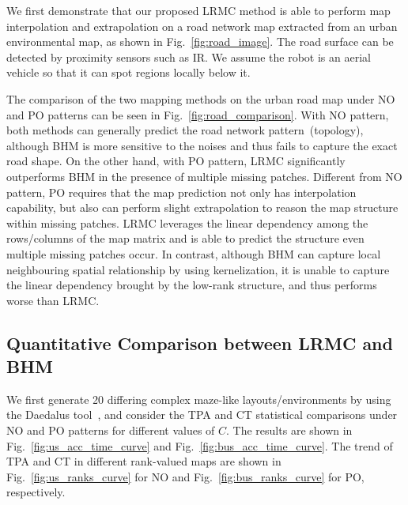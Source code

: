 We first demonstrate that our proposed LRMC method is able to perform map interpolation and extrapolation on a road network map extracted from an  urban environmental map, as shown in Fig.~\ref{fig:road_image}. 
The road surface can be detected by proximity sensors such as IR. We assume the robot is an aerial vehicle so that it can spot regions locally below it. 

The comparison of the two mapping methods on the urban road map under NO and PO patterns can be seen in Fig.~\ref{fig:road_comparison}. With NO pattern, both methods can generally predict the road network pattern~(topology), although BHM is more sensitive to the noises and thus fails to capture the exact road shape. On the other hand, with PO pattern, LRMC significantly outperforms BHM in the presence of multiple missing patches. 
Different from NO pattern, PO requires that the map prediction not only has interpolation capability, but also can perform slight extrapolation to reason the map structure within missing patches. 
LRMC leverages the linear dependency among the rows/columns of the map matrix and is able to predict the structure even multiple missing patches occur. In contrast, although BHM can capture local neighbouring spatial relationship by using kernelization, it is unable to capture the linear dependency brought by the low-rank structure, and thus performs worse than LRMC. 

\subsection{Quantitative Comparison between LRMC and BHM}

We first generate 20 differing complex maze-like layouts/environments by using the Daedalus tool~\cite{daedalus}, and consider the TPA and CT statistical comparisons under NO and PO patterns for different values of $C$. 
The results are shown in Fig.~\ref{fig:us_acc_time_curve} and Fig.~\ref{fig:bus_acc_time_curve}. 
The trend of TPA and CT in different rank-valued maps %
are shown in Fig.~\ref{fig:us_ranks_curve} for NO and Fig.~\ref{fig:bus_ranks_curve} for PO, respectively.

